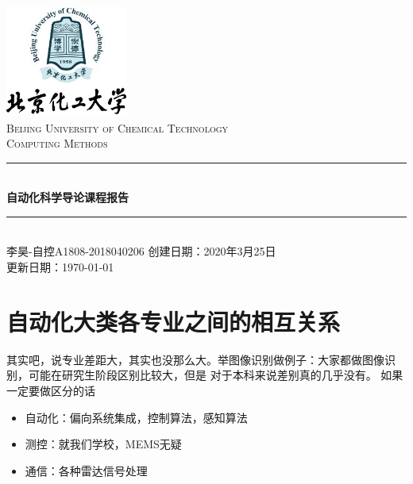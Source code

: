 \documentclass[cs4size,a4paper]{ctexart}
\numberwithin{equation}{section}
\numberwithin{table}{section}
\numberwithin{figure}{section}
\newcommand{\HRule}{\rule{\linewidth}{0.5mm}}
\begin{document}
\newtheorem{example}{例}              	%
\newtheorem{algorithem}{算法}	
\newtheorem{theorem}{定理}            	%
\newtheorem{definition}{定义}
\newtheorem{axiom}{公理}
\newtheorem{property}{性质}
\newtheorem{proposition}{命题}
\newtheorem{lemma}{引理}
\newtheorem{corollary}{推论}
\newtheorem{remark}{注解}
\newtheorem{condition}{条件}
\newtheorem{conclusion}{结论}
\newtheorem{assumption}{假设}
\renewcommand{\contentsname}{目录}     
\renewcommand{\abstractname}{摘要} 
\renewcommand{\refname}{参考文献}     
\renewcommand{\indexname}{索引}
\renewcommand{\figurename}{图}
\renewcommand{\tablename}{表}
\renewcommand{\appendixname}{附录}
\renewcommand{\proofname}{证明}
\renewcommand\emph[1]{\textcolor{black}{\textbf{#1}}}
\begin{titlepage}
\begin{center}
\includegraphics[width=0.30\textwidth]{logo}\\[1cm]    
\textsc{\Large Beijing University of Chemical Technology}\\[1.0cm]
\textsc{\Large Computing Methods}\\[0.5cm]
\HRule \\[0.8cm]
{\huge \bfseries 自动化科学导论课程报告}\\[0.4cm]
\HRule \\[0.7cm]
\textsc{李昊-自控A1808-2018040206}
\tableofcontents 
\vfill
{创建日期：2020年3月25日}\\
{更新日期：\today}
\end{center}
\end{titlepage}
\pagestyle{plain}
\thispagestyle{empty}
\pagestyle{fancy}



\section{自动化大类各专业之间的相互关系}
其实吧，说专业差距大，其实也没那么大。举图像识别做例子：大家都做图像识别，可能在研究生阶段区别比较大，但是
对于本科来说差别真的几乎没有。
如果一定要做区分的话
\begin{itemize}
        \item 自动化：偏向系统集成，控制算法，感知算法
        \item 测控：就我们学校，MEMS无疑
        \item 通信：各种雷达信号处理
\end{itemize}
\end{document}

